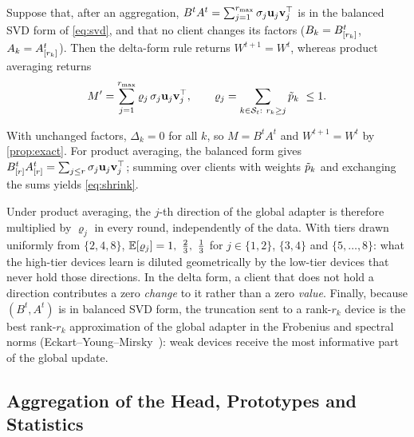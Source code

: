 \begin{proposition}[Consistency]\label{prop:consistency}
Suppose that, after an aggregation, $B^tA^t=\sum_{j=1}^{r_{\max}}\sigma_j\mathbf{u}_j\mathbf{v}_j^\top$
is in the balanced SVD form of \cref{eq:svd}, and that no client changes its factors
($B_k=B^t_{[r_k]}$, $A_k=A^t_{[r_k]}$). Then the delta-form rule returns
$W^{t+1}=W^t$, whereas product averaging returns
\begin{equation}\label{eq:shrink}
  M'=\sum_{j=1}^{r_{\max}}\varrho_j\,\sigma_j\mathbf{u}_j\mathbf{v}_j^\top,\qquad
  \varrho_j=\sum_{k\in\mathcal{S}_t:\ r_k\ge j}\tilde{p}_k\ \le 1 .
\end{equation}
\end{proposition}
\begin{IEEEproof}
With unchanged factors, $\Delta_k=0$ for all $k$, so $M=B^tA^t$ and $W^{t+1}=W^t$ by
\cref{prop:exact}. For product averaging, the balanced form gives
$B^t_{[r]}A^t_{[r]}=\sum_{j\le r}\sigma_j\mathbf{u}_j\mathbf{v}_j^\top$; summing over clients
with weights $\tilde{p}_k$ and exchanging the sums yields \cref{eq:shrink}.
\end{IEEEproof}
Under product averaging, the $j$-th direction of the global adapter is therefore multiplied by
$\varrho_j$ in every round, independently of the data. With tiers drawn uniformly from $\{2,4,8\}$,
$\E[\varrho_j]=1,\ \tfrac{2}{3},\ \tfrac{1}{3}$ for $j\in\{1,2\}$, $\{3,4\}$ and $\{5,\dots,8\}$: what the
high-tier devices learn is diluted geometrically by the low-tier devices that never hold those
directions. In the delta form, a client that does not hold a direction contributes a zero
\emph{change} to it rather than a zero \emph{value}. Finally, because $(B^t,A^t)$ is in balanced SVD
form, the truncation sent to a rank-$r_k$ device is the best rank-$r_k$ approximation of the global
adapter in the Frobenius and spectral norms (Eckart--Young--Mirsky~\cite{eckart1936approximation}):
weak devices receive the most informative part of the global update.

\subsection{Aggregation of the Head, Prototypes and Statistics}\label{sec:method:stats}

